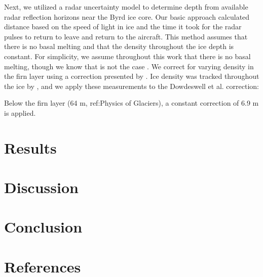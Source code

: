 \documentclass[draft,jgrga]{agutex}
\begin{document}
Next, we utilized a radar uncertainty model to determine depth from
available radar reflection horizons near the Byrd ice core. Our basic
approach calculated distance based on the speed of light in ice and
the time it took for the radar pulses to return to leave and return to
the aircraft. This method assumes that there is no basal melting and
that the density throughout the ice depth is constant. For simplicity,
we assume throughout this work that there is no basal melting, though
we know that is not the case \citep{Gow68}. We correct for varying
density in the firn layer using a correction presented by
\citet{Dowdeswell04}. Ice density was tracked throughout the ice by
\citet{Gow68}, and we apply these measurements to the Dowdeswell et
al. correction:


Below the firn layer (64 m, ref:Physics of Glaciers), a constant
correction of 6.9 m is applied.



\section{Results}

\section{Discussion}

\section{Conclusion}

\section{References}



\end{document}
